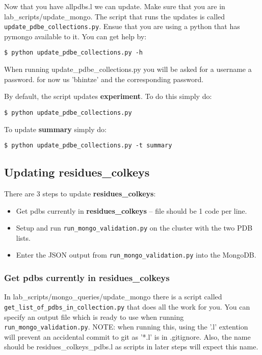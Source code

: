 \documentclass[12pt]{article}
\newcommand{\cmdline}[1]{\vspace{5mm} \noindent
\texttt{\$ #1}
\vspace{5mm}

}
\newcommand{\mdbcol}[1]{{\color{Bittersweet}\textbf{#1}}}
\begin{document}
\noindent
Now that you have allpdbs.l we can update. Make sure that you are in\\lab\_scripts/update\_mongo. The script that runs the updates is called\\ \texttt{update\_pdbe\_collections.py}. Ensue that you are using a python that has pymongo available to it. You can get help by:

\cmdline{python update\_pdbe\_collections.py -h}

\noindent
When running update\_pdbe\_collections.py you will be asked for a username a password. for now us 'bhintze' and the corresponding password.

\vspace{5mm}
\noindent
By default, the script updates \mdbcol{experiment}. To do this simply do:

\cmdline{python update\_pdbe\_collections.py}

\noindent
To update \mdbcol{summary} simply do:

\cmdline{python update\_pdbe\_collections.py -t summary}

\subsection{Updating \mdbcol{residues\_colkeys}}

There are 3 steps to update \mdbcol{residues\_colkeys}:
\begin{itemize}
\item Get pdbs currently in \mdbcol{residues\_colkeys} -- file should be 1 code per line.
\item Setup and run \texttt{run\_mongo\_validation.py} on the cluster with the two PDB lists.
\item Enter the JSON output from \texttt{run\_mongo\_validation.py} into the MongoDB. 
\end{itemize}

\subsubsection*{Get pdbs currently in \mdbcol{residues\_colkeys}}
In lab\_scripts/mongo\_queries/update\_mongo there is a script called\\ \texttt{get\_list\_of\_pdbs\_in\_collection.py} that does all the work for you. You can specify an output file which is ready to use when running \\ \texttt{run\_mongo\_validation.py}. NOTE: when running this, using the '.l' extention will prevent an accidental commit to git as '*.l' is in .gitignore. Also, the name should be residues\_colkeys\_pdbs.l as scripts in later steps will expect this name.
\end{document}
